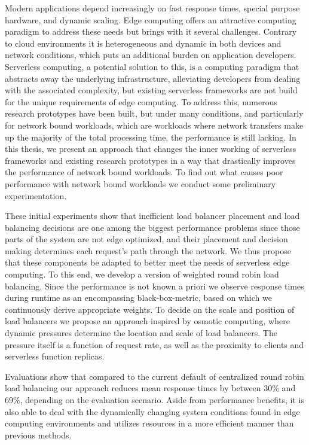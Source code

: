 Modern applications depend increasingly on fast response times, special purpose hardware, and dynamic scaling.
Edge computing offers an attractive computing paradigm to address these needs but brings with it several challenges. Contrary to cloud environments it is heterogeneous and dynamic in both devices and network conditions, which puts an additional burden on application developers.
Serverless computing, a potential solution to this, is a computing paradigm that abstracts away the underlying infrastructure, alleviating developers from dealing with the associated complexity, but existing serverless frameworks are not build for the unique requirements of edge computing.
To address this, numerous research prototypes have been built, but under many conditions, and particularly for network bound workloads, which are workloads where network transfers make up the majority of the total processing time, the performance is still lacking.
In this thesis, we present an approach that changes the inner working of serverless frameworks and existing research prototypes in a way that drastically improves the performance of network bound workloads.
To find out what causes poor performance with network bound workloads we conduct some preliminary experimentation.

These initial experiments show that inefficient load balancer placement and load balancing decisions are one among the biggest performance problems since those parts of the system are not edge optimized, and their placement and decision making determines each request's path through the network.
We thus propose that these components be adapted to better meet the needs of serverless edge computing.
To this end, we develop a version of weighted round robin load balancing. Since the performance is not known a priori we observe response times during runtime as an encompassing black-box-metric, based on which we continuously derive appropriate weights.
To decide on the scale and position of load balancers we propose an approach inspired by osmotic computing, where dynamic pressures determine the location and scale of load balancers. The pressure itself is a function of request rate, as well as the proximity to clients and serverless function replicas.

Evaluations show that compared to the current default of centralized round robin load balancing our approach reduces mean response times by between 30\% and 69\%, depending on the evaluation scenario.
Aside from performance benefits, it is also able to deal with the dynamically changing system conditions found in edge computing environments and utilizes resources in a more efficient manner than previous methods.